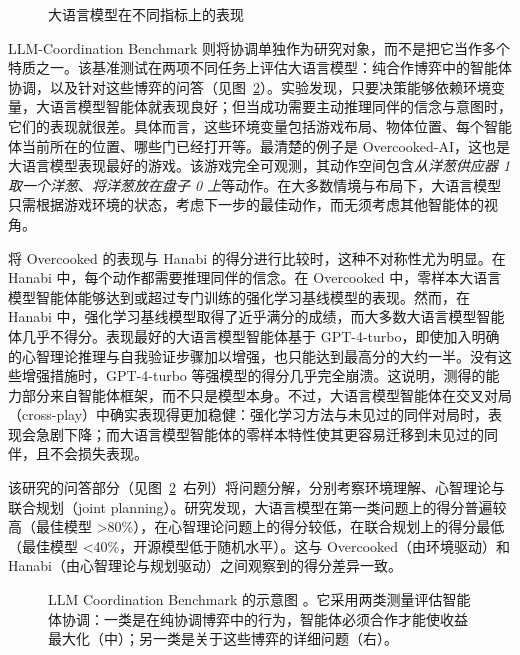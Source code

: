\begin{figure}
  \begin{center}
    
    \caption{大语言模型在不同指标上的表现 \citep{xu2024magic}}\label{fig:radar}
  \end{center}
\end{figure}

LLM-Coordination Benchmark \citep{agashe2025llm} 则将协调单独作为研究对象，而不是把它当作多个特质之一。该基准测试在两项不同任务上评估大语言模型：纯合作博弈中的智能体协调，以及针对这些博弈的问答（见图~\ref{fig:agashe}）。实验发现，只要决策能够依赖环境变量，大语言模型智能体就表现良好；但当成功需要主动推理同伴的信念与意图时，它们的表现就很差。具体而言，这些环境变量包括游戏布局、物体位置、每个智能体当前所在的位置、哪些门已经打开等。最清楚的例子是 Overcooked-AI，这也是大语言模型表现最好的游戏。该游戏完全可观测，其动作空间包含{\em 从洋葱供应器 1 取一个洋葱}、{\em 将洋葱放在盘子 0 上}等动作。在大多数情境与布局下，大语言模型只需根据游戏环境的状态，考虑下一步的最佳动作，而无须考虑其他智能体的视角。

将 Overcooked 的表现与 Hanabi 的得分进行比较时，这种不对称性尤为明显。在 Hanabi 中，每个动作都需要推理同伴的信念。在 Overcooked 中，零样本大语言模型智能体能够达到或超过专门训练的强化学习基线模型的表现。然而，在 Hanabi 中，强化学习基线模型取得了近乎满分的成绩，而大多数大语言模型智能体几乎不得分。表现最好的大语言模型智能体基于 GPT-4-turbo，即使加入明确的心智理论推理与自我验证步骤加以增强，也只能达到最高分的大约一半。没有这些增强措施时，GPT-4-turbo 等强模型的得分几乎完全崩溃。这说明，测得的能力部分来自智能体框架，而不只是模型本身。不过，大语言模型智能体在交叉对局（cross-play）中确实表现得更加稳健：强化学习方法与未见过的同伴对局时，表现会急剧下降；而大语言模型智能体的零样本特性使其更容易迁移到未见过的同伴，且不会损失表现。

该研究的问答部分（见图~\ref{fig:agashe}~右列）将问题分解，分别考察环境理解、心智理论与联合规划（joint planning）。研究发现，大语言模型在第一类问题上的得分普遍较高（最佳模型 >80\%），在心智理论问题上的得分较低，在联合规划上的得分最低（最佳模型 <40\%，开源模型低于随机水平）。这与 Overcooked（由环境驱动）和 Hanabi（由心智理论与规划驱动）之间观察到的得分差异一致。

\begin{figure}
  \begin{center}
    
    \caption{LLM Coordination Benchmark 的示意图 \citep{agashe2025llm}。它采用两类测量评估智能体协调：一类是在纯协调博弈中的行为，智能体必须合作才能使收益最大化（中）；另一类是关于这些博弈的详细问题（右）。}\label{fig:agashe}
  \end{center}
\end{figure}

